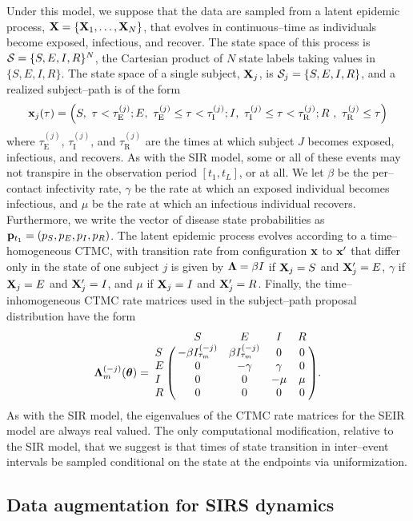 Under this model, we suppose that the data are sampled from a latent epidemic process, $ \mathbf{X} = \lbrace \mathbf{X}_1,\dots,\mathbf{X}_N\rbrace $, that evolves in continuous--time as individuals become exposed, infectious, and recover. The state space of this process is $ \mathcal{S} = \lbrace S,E,I,R\rbrace^N $, the Cartesian product of $ N $ state labels taking values in $ \lbrace S,E,I,R\rbrace $. The state space of a single subject, $ \mathbf{X}_j $, is $\mathcal{S}_j = \lbrace S, E, I, R\rbrace $, and a realized subject--path is of the form $$ \mathbf{x}_j(\tau) = \left (S,\ \tau < \tau^{(j)}_{\mathrm{E}};E,\  \tau^{(j)}_{\mathrm{E}} \leq \tau < \tau^{(j)}_{\mathrm{I}};I,\ \tau^{(j)}_{\mathrm{I}} \leq \tau < \tau^{(j)}_{\mathrm{R}};R\ ,\ \tau^{(j)}_{\mathrm{R}} \leq \tau
\right ) $$
where $ \tau^{(j)}_{\mathrm{E}} $, $ \tau^{(j)}_{\mathrm{I}} $, and $ \tau^{(j)}_{\mathrm{R}} $ are the times at which subject $ J $ becomes exposed, infectious, and recovers. As with the SIR model, some or all of these events may not transpire in the observation period $ [t_1,t_L] $, or at all. We let $ \beta $ be the per--contact infectivity rate, $ \gamma $ be the rate at which an exposed individual becomes infectious, and $ \mu $ be the rate at which an infectious individual recovers. Furthermore, we write the vector of disease state probabilities as $ \mathbf{p}_{t_1} = (p_S,p_E,p_I,p_R) $. The latent epidemic process evolves according to a time--homogeneous CTMC, with transition rate from configuration $ \mathbf{x} $ to $ \mathbf{x}^\prime $ that differ only in the state of one subject $ j $ is given by $ \boldsymbol{\Lambda} = \beta I $ if $ \mathbf{X}_j = S $ and $ \mathbf{X}^\prime_j = E$, $ \gamma $ if $ \mathbf{X}_j = E $ and $ \mathbf{X}^\prime_j = I$, and $ \mu $ if $ \mathbf{X}_j = I $ and $ \mathbf{X}^\prime_j = R$. Finally, the time--inhomogeneous CTMC rate matrices used in the subject--path proposal distribution have the form
\begin{equation} \bLambda_m^{(-j)}(\btheta) = \bordermatrix{ & S & E & I & R \cr
	S & -\beta I_{\tau_m}^{(-j)} & \beta I_{\tau_m}^{(-j)} & 0 & 0 \cr 
	E & 0 & -\gamma & \gamma & 0 \cr
	I & 0 & 0 & -\mu & \mu \cr
	R & 0 & 0 & 0 & 0 }.
\end{equation}
As with the SIR model, the eigenvalues of the CTMC rate matrices for the SEIR model are always real valued. The only computational modification, relative to the SIR model, that we suggest is that times of state transition in inter--event intervals be sampled conditional on the state at the endpoints via uniformization.

\subsection{Data augmentation for SIRS dynamics}
\label{subsec:bda_sirs_model}

